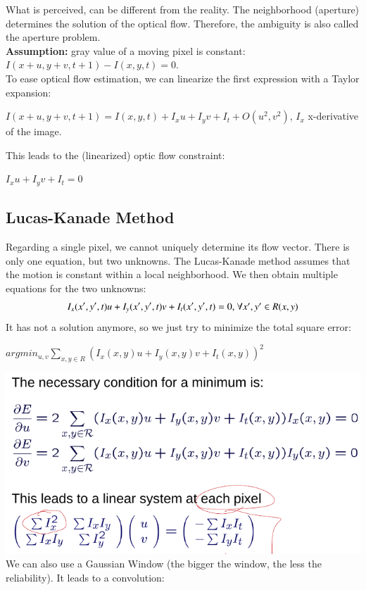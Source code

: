 \documentclass{article}
\begin{document}
What is perceived, can be different from the reality. The neighborhood (aperture) determines the solution of the optical flow. Therefore, the ambiguity is also called the aperture problem.\\
\textbf{Assumption:} gray value of a moving pixel is constant: $I(x+u,y+v,t+1)-I(x,y,t)=0$.\\
To ease optical flow estimation, we can linearize the first expression with a Taylor expansion:
\begin{center}
$I(x+u,y+v,t+1)=I(x,y,t)+I_xu+I_yv+I_t+O(u^2,v^2)$, $I_x$ x-derivative of the image.
\end{center}
This leads to the (linearized) optic flow constraint:
\begin{center}
$I_xu+I_yv+I_t=0$
\end{center}
\subsection{Lucas-Kanade Method}
Regarding a single pixel, we cannot uniquely determine its flow vector. There is only one equation, but two unknowns.  The Lucas-Kanade method assumes that the motion is constant within a local neighborhood. We then obtain multiple equations for the two unknowns:
\begin{equation}
I_x(x',y',t)u+I_y(x',y',t)v+I_t(x',y',t)=0$, $\forall x',y'\in R(x,y)
\end{equation}
It has not a solution anymore, so we just try to minimize the total square error:\\
\begin{center}
$argmin_{u,v} \sum_{x,y\in R}(I_x(x,y)u+I_y(x,y)v+I_t(x,y))^2$
\end{center}
\includegraphics[scale=0.3]{55.png}\\
We can also use a Gaussian Window (the bigger the window, the less the reliability). It leads to a convolution:\\
\end{document}
